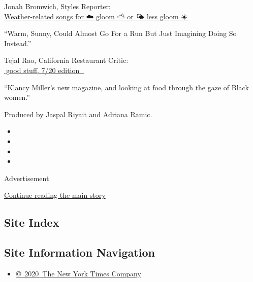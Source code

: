 Jonah Bromwich, Styles Reporter:\\
\href{https://docs.google.com/spreadsheets/d/1eA5nPV5vrvBvPXQTKBUI3sykmQrdRmRYDiKd4s78rwg/edit?usp=sharing}{Weather-related
songs for ☁️ gloom ⛅️ or 🌤 less gloom ☀️🎵}

``Warm, Sunny, Could Almost Go For a Run But Just Imagining Doing So
Instead.''

Tejal Rao, California Restaurant Critic:\\
\href{https://docs.google.com/document/d/1NLGdoU08GAon-47tCgaJq4zyfzLofZ31o3uBgDeUs9s/edit?usp=sharing}{🌟good
stuff, 7/20 edition 🌟}

``Klancy Miller's new magazine, and looking at food through the gaze of
Black women.''

Produced by Jaspal Riyait and Adriana Ramic.

\begin{itemize}
\item
\item
\item
\item
\end{itemize}

Advertisement

\protect\hyperlink{after-bottom}{Continue reading the main story}

\hypertarget{site-index}{%
\subsection{Site Index}\label{site-index}}

\hypertarget{site-information-navigation}{%
\subsection{Site Information
Navigation}\label{site-information-navigation}}

\begin{itemize}
\tightlist
\item
  \href{https://help.nytimes3xbfgragh.onion/hc/en-us/articles/115014792127-Copyright-notice}{©~2020~The
  New York Times Company}
\end{itemize}

